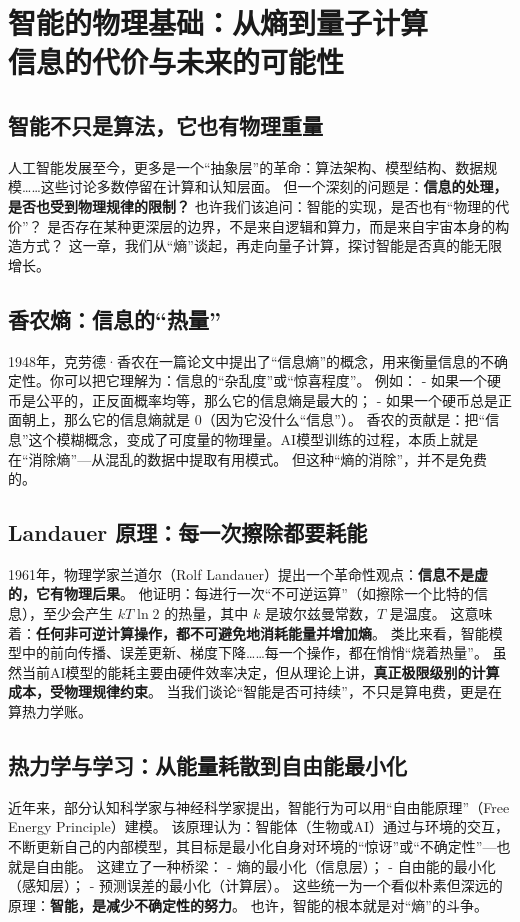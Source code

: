 \chapter{智能的物理基础：从熵到量子计算\texorpdfstring{\\}{ }信息的代价与未来的可能性}
\section*{智能不只是算法，它也有物理重量}
人工智能发展至今，更多是一个“抽象层”的革命：算法架构、模型结构、数据规模……这些讨论多数停留在计算和认知层面。
但一个深刻的问题是：\textbf{信息的处理，是否也受到物理规律的限制？}
也许我们该追问：智能的实现，是否也有“物理的代价”？
是否存在某种更深层的边界，不是来自逻辑和算力，而是来自宇宙本身的构造方式？
这一章，我们从“熵”谈起，再走向量子计算，探讨智能是否真的能无限增长。
\section*{香农熵：信息的“热量”}
1948年，克劳德·香农在一篇论文中提出了“信息熵”的概念，用来衡量信息的不确定性。你可以把它理解为：信息的“杂乱度”或“惊喜程度”。
例如：
- 如果一个硬币是公平的，正反面概率均等，那么它的信息熵是最大的；
- 如果一个硬币总是正面朝上，那么它的信息熵就是 0（因为它没什么“信息”）。
香农的贡献是：把“信息”这个模糊概念，变成了可度量的物理量。AI模型训练的过程，本质上就是在“消除熵”---从混乱的数据中提取有用模式。
但这种“熵的消除”，并不是免费的。
\section*{Landauer 原理：每一次擦除都要耗能}
1961年，物理学家兰道尔（Rolf Landauer）提出一个革命性观点：\textbf{信息不是虚的，它有物理后果}。
他证明：每进行一次“不可逆运算”（如擦除一个比特的信息），至少会产生 $kT\ln2$ 的热量，其中 $k$ 是玻尔兹曼常数，$T$ 是温度。
这意味着：\textbf{任何非可逆计算操作，都不可避免地消耗能量并增加熵}。
类比来看，智能模型中的前向传播、误差更新、梯度下降……每一个操作，都在悄悄“烧着热量”。
虽然当前AI模型的能耗主要由硬件效率决定，但从理论上讲，\textbf{真正极限级别的计算成本，受物理规律约束}。
当我们谈论“智能是否可持续”，不只是算电费，更是在算热力学账。
\section*{热力学与学习：从能量耗散到自由能最小化}
近年来，部分认知科学家与神经科学家提出，智能行为可以用“自由能原理”（Free Energy Principle）建模。
该原理认为：智能体（生物或AI）通过与环境的交互，不断更新自己的内部模型，其目标是最小化自身对环境的“惊讶”或“不确定性”---也就是自由能。
这建立了一种桥梁：
- 熵的最小化（信息层）；
- 自由能的最小化（感知层）；
- 预测误差的最小化（计算层）。
这些统一为一个看似朴素但深远的原理：\textbf{智能，是减少不确定性的努力}。
也许，智能的根本就是对“熵”的斗争。
